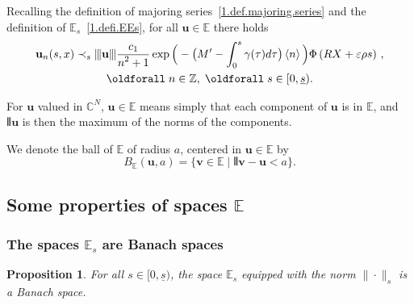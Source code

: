 \documentclass[10pt]{amsart}
\newtheorem{prop}[cdrthm]{Proposition}
\theoremstyle{definition}
\theoremstyle{plain}
\newcommand*\e{\varepsilon}
\newcommand*\Z{{\mathbb Z}}
\newcommand*\EE{{\mathbb E}}
\newcommand*\g{\gamma}
\newcommand{\ubf}{{\mathbf u}}
\newcommand{\vbf}{{\mathbf v}}
\newcommand*\und{\underline}
\DeclarePairedDelimiter{\VERT}{|\mkern -1.6mu|\mkern -1.6mu|}{|\mkern -1.6mu|\mkern -1.6mu|}
\renewcommand*{\forall}{\mathrel{\oldforall}}
\begin{document}
Recalling the definition of majoring series~\eqref{1.def.majoring.series} and the definition of $\EE_{s}$~\eqref{1.defi.EEs}, for all $\ubf\in\EE$ there holds
\begin{multline}\label{1.esti.u}
\ubf_n(s,x) \prec_{s} \VERT{\ubf} \frac{\displaystyle c_1}{\displaystyle n^2+1}\exp\Big({}-\big(M' - \int_{0}^{s} \g(\tau) d\tau \big)\left< n \right>\Big) \Phi\left(R X+\e\rho s\right)\,,\\
\forall n \in\Z,\; \forall s\in[0,\und{s}).
\end{multline}


For $\ubf$ valued in $\mathbb{C}^{N}$, $\ubf\in\EE$ means simply that each component of $\ubf$ is in $\EE$, and $\VERT{ \ubf}$ is then the maximum of the norms of the components.

We denote the ball of $\EE$ of radius $a$, centered in $\ubf\in\EE$ by
\begin{equation}\label{1.defi.ball}
B_{\EE}(\ubf,a) = \big\{ \vbf\in\EE \;|\; \VERT{\vbf - \ubf} < a \big\}.
\end{equation}



\subsection{Some properties of spaces \texorpdfstring{$\EE$}{EE}}


\subsubsection{The spaces \texorpdfstring{$\EE_{s}$}{EEs} are Banach spaces}


\begin{prop}
For all $s\in[0,\und{s})$, the space $\EE_{s}$ equipped with the norm $\|\cdot\|_{s}$ is a Banach space.
\end{prop}
\end{document}
